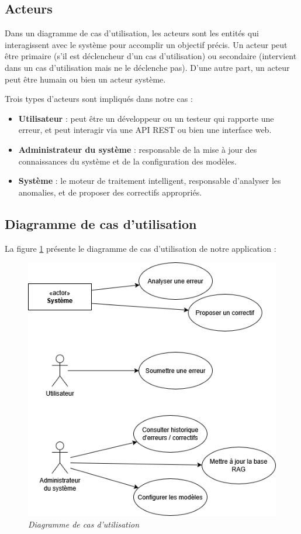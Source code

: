 \documentclass[12pt,a4paper]{report}
\begin{document}
	\subsection{Acteurs}
	
	Dans un diagramme de cas d'utilisation, les acteurs sont les entités qui interagissent avec le système pour accomplir un objectif précis. Un acteur peut être primaire (s'il est déclencheur d'un cas d'utilisation) ou secondaire (intervient dans un cas d'utilisation mais ne le déclenche pas). D'une autre part, un acteur peut être humain ou bien un acteur système.
	
	Trois types d'acteurs sont impliqués dans notre cas :
	
	\begin{itemize}
		\item \textbf{Utilisateur} : peut être un développeur ou un testeur qui rapporte une erreur, et peut interagir via une API REST ou bien une interface web.
		
		\item \textbf{Administrateur du système} : responsable de la mise à jour des connaissances du système et de la configuration des modèles.
		
		\item \textbf{Système} : le moteur de traitement intelligent, responsable d'analyser les anomalies, et de proposer des correctifs appropriés.
	\end{itemize}
	
	\subsection{Diagramme de cas d'utilisation}
	
	La figure \ref{fig:use-case} présente le diagramme de cas d'utilisation de notre application :
	
	\begin{figure}[H]
		\centering
		\includegraphics{use-case.drawio.png}
		\caption{\textit{Diagramme de cas d'utilisation}}
		\label{fig:use-case}
	\end{figure}
	
\end{document}
